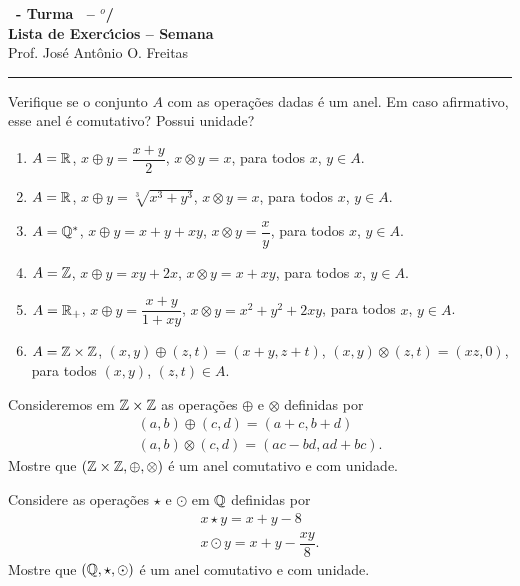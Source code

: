 \documentclass[12pt]{exam}
\begin{document}
    \begin{center}
    {\Large\bf \disciplina\ - Turma \turma\ -- \semestre$^{o}$/\ano} \\ \vspace{9pt} {\large\bf
        Lista de Exerc{\'\i}cios -- Semana \numerosemana}\\ \vspace{9pt} Prof. Jos{\'e} Ant{\^o}nio O. Freitas
    \end{center}
    \hrule

    \vspace{.6cm}

    \questao{} Verifique se o conjunto $A$ com as opera\c{c}\~oes dadas \'e um anel. Em caso afirmativo, esse anel \'e comutativo? Possui unidade?
    \begin{enumerate}[label={\alph*})]
        \item $A = \mathbb{R}$, $x \oplus y = \dfrac{x + y}{2}$, $x \otimes y = x$, para todos $x$, $y \in A$.
        \item $A = \mathbb{R}$, $x \oplus y = \sqrt[3]{x^3 + y^3}$, $x \otimes y = x$, para todos $x$, $y \in A$.
        \item $A = \mathbb{Q}^*$, $x \oplus y = x + y + xy$, $x \otimes y = \dfrac{x}{y}$, para todos $x$, $y \in A$.
        \item $A = \mathbb{Z}$, $x \oplus y = xy + 2x$, $x \otimes y = x + xy$, para todos $x$, $y \in A$.
        \item $A = \mathbb{R}_+$, $x \oplus y = \dfrac{x + y}{1 + xy}$, $x \otimes y = x^2 + y^2 + 2xy$, para todos $x$, $y \in A$.
        \item $A = \mathbb{Z} \times \mathbb{Z}$, $(x, y) \oplus (z, t) = (x + y, z + t)$, $(x, y) \otimes (z, t) = (xz, 0)$, para todos $(x, y)$, $(z, t) \in A$.
    \end{enumerate}

    \vspace{.4cm}

    \questao{} Consideremos em $\mathbb{Z} \times \mathbb{Z}$ as opera\c{c}\~oes $\oplus$ e $\otimes$ definidas por
    \begin{align*}
        (a, b) \oplus (c, d) = (a + c, b + d)\\
        (a ,b) \otimes (c, d) = (ac - bd, ad + bc).
    \end{align*}
    Mostre que $(\mathbb{Z} \times \mathbb{Z}, \oplus, \otimes)$ \'e um anel comutativo e com unidade.

    \vspace{.4cm}

    \questao{} Considere as opera\c{c}\~oes $\star$ e $\odot$ em $\mathbb{Q}$ definidas por
    \begin{align*}
        x \star y = x + y - 8\\
        x \odot y = x + y - \dfrac{xy}{8}.
    \end{align*}
    Mostre que $(\mathbb{Q}, \star, \odot)$ \'e um anel comutativo e com unidade.
\end{document}
